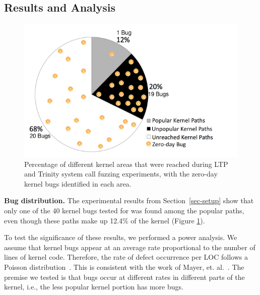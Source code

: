 \subsection{Results and Analysis}
\label{Verification-of-Hypothesis}
\begin{figure}
\centering
\includegraphics[width=1.0\columnwidth]{diagram/popular_paths.png}
\caption{\small Percentage of different kernel areas that were reached during
 LTP and Trinity system call fuzzing experiments, with the zero-day kernel bugs identified
 in each area.}
\label{fig:coverage}
\end{figure}

{\bf Bug distribution.}
The experimental results from Section~\ref{sec-setup} show that only one of the 40 kernel bugs
tested for was found among the popular paths, even though these paths make up 12.4\% of the kernel
(Figure \ref{fig:coverage}).

To test the significance of these results, we performed a power analysis.
%
We assume that kernel bugs appear at an average rate proportional to the
number of lines of kernel code.
Therefore, the rate of defect occurrence per LOC
follows a Poisson distribution~\cite{Poisson-distribution}.
This is consistent with the work of Mayer, et. al.~\cite{mayer1989probability}.
The premise we tested is that bugs occur at different rates in different
parts of the kernel, i.e., the less popular kernel portion has more bugs.

